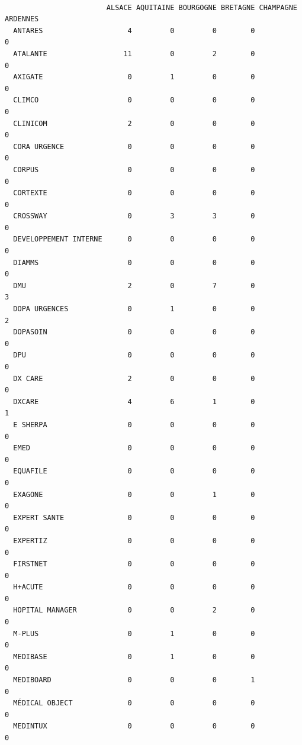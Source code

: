 \documentclass[]{article}
\begin{document}
\begin{verbatim}
                       
                        ALSACE AQUITAINE BOURGOGNE BRETAGNE CHAMPAGNE ARDENNES
  ANTARES                    4         0         0        0                  0
  ATALANTE                  11         0         2        0                  0
  AXIGATE                    0         1         0        0                  0
  CLIMCO                     0         0         0        0                  0
  CLINICOM                   2         0         0        0                  0
  CORA URGENCE               0         0         0        0                  0
  CORPUS                     0         0         0        0                  0
  CORTEXTE                   0         0         0        0                  0
  CROSSWAY                   0         3         3        0                  0
  DEVELOPPEMENT INTERNE      0         0         0        0                  0
  DIAMMS                     0         0         0        0                  0
  DMU                        2         0         7        0                  3
  DOPA URGENCES              0         1         0        0                  2
  DOPASOIN                   0         0         0        0                  0
  DPU                        0         0         0        0                  0
  DX CARE                    2         0         0        0                  0
  DXCARE                     4         6         1        0                  1
  E SHERPA                   0         0         0        0                  0
  EMED                       0         0         0        0                  0
  EQUAFILE                   0         0         0        0                  0
  EXAGONE                    0         0         1        0                  0
  EXPERT SANTE               0         0         0        0                  0
  EXPERTIZ                   0         0         0        0                  0
  FIRSTNET                   0         0         0        0                  0
  H+ACUTE                    0         0         0        0                  0
  HOPITAL MANAGER            0         0         2        0                  0
  M-PLUS                     0         1         0        0                  0
  MEDIBASE                   0         1         0        0                  0
  MEDIBOARD                  0         0         0        1                  0
  MÉDICAL OBJECT             0         0         0        0                  0
  MEDINTUX                   0         0         0        0                  0

\end{verbatim}
\end{document}
